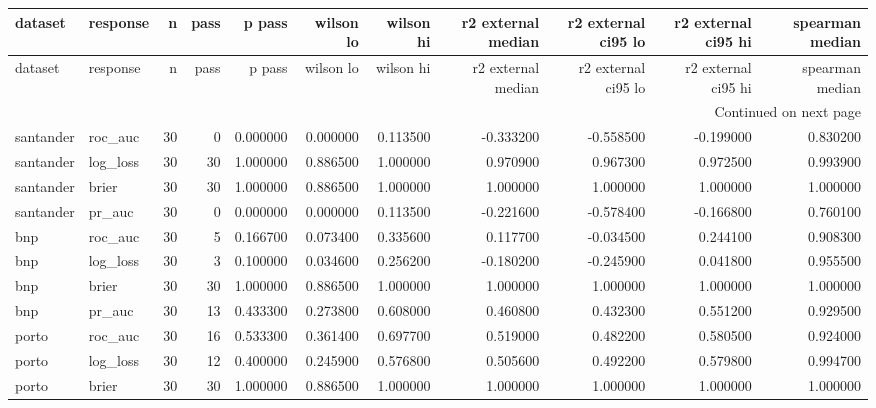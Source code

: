 \begin{center}\label{tab:s6gate}\end{center}
\begingroup\tiny\setlength{\tabcolsep}{2.5pt}
\begin{longtable}{llrrrrrrrrr}
\toprule
dataset & response & n & pass & p pass & wilson lo & wilson hi & r2 external median & r2 external ci95 lo & r2 external ci95 hi & spearman median \\
\midrule
\endfirsthead
\toprule
dataset & response & n & pass & p pass & wilson lo & wilson hi & r2 external median & r2 external ci95 lo & r2 external ci95 hi & spearman median \\
\midrule
\endhead
\midrule
\multicolumn{11}{r}{Continued on next page} \\
\midrule
\endfoot
\bottomrule
\endlastfoot
santander & roc\_auc & 30 & 0 & 0.000000 & 0.000000 & 0.113500 & -0.333200 & -0.558500 & -0.199000 & 0.830200 \\
santander & log\_loss & 30 & 30 & 1.000000 & 0.886500 & 1.000000 & 0.970900 & 0.967300 & 0.972500 & 0.993900 \\
santander & brier & 30 & 30 & 1.000000 & 0.886500 & 1.000000 & 1.000000 & 1.000000 & 1.000000 & 1.000000 \\
santander & pr\_auc & 30 & 0 & 0.000000 & 0.000000 & 0.113500 & -0.221600 & -0.578400 & -0.166800 & 0.760100 \\
bnp & roc\_auc & 30 & 5 & 0.166700 & 0.073400 & 0.335600 & 0.117700 & -0.034500 & 0.244100 & 0.908300 \\
bnp & log\_loss & 30 & 3 & 0.100000 & 0.034600 & 0.256200 & -0.180200 & -0.245900 & 0.041800 & 0.955500 \\
bnp & brier & 30 & 30 & 1.000000 & 0.886500 & 1.000000 & 1.000000 & 1.000000 & 1.000000 & 1.000000 \\
bnp & pr\_auc & 30 & 13 & 0.433300 & 0.273800 & 0.608000 & 0.460800 & 0.432300 & 0.551200 & 0.929500 \\
porto & roc\_auc & 30 & 16 & 0.533300 & 0.361400 & 0.697700 & 0.519000 & 0.482200 & 0.580500 & 0.924000 \\
porto & log\_loss & 30 & 12 & 0.400000 & 0.245900 & 0.576800 & 0.505600 & 0.492200 & 0.579800 & 0.994700 \\
porto & brier & 30 & 30 & 1.000000 & 0.886500 & 1.000000 & 1.000000 & 1.000000 & 1.000000 & 1.000000 \\

\end{longtable}
